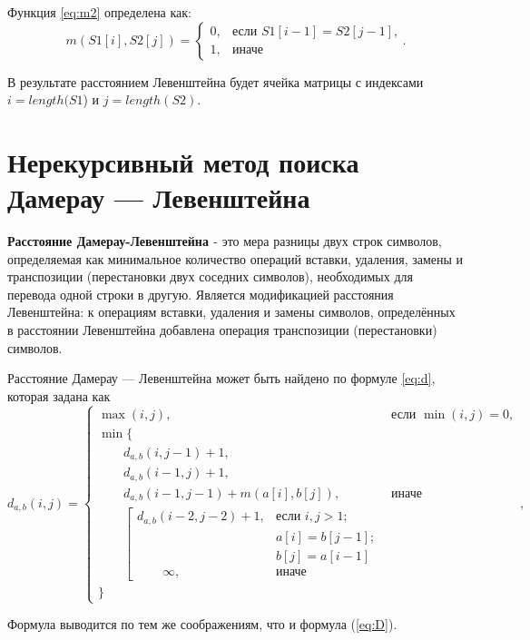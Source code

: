 Функция \ref{eq:m2} определена как:
\begin{equation}
\label{eq:m2}
m(S1[i], S2[j]) = \begin{cases}
0, &\text{если $S1[i - 1] = S2[j - 1]$,}\\
1, &\text{иначе}
\end{cases}.
\end{equation}
 
В результате расстоянием Левенштейна будет ячейка матрицы с индексами $i = length(S1$) и $j = length(S2)$.

\newpage
\section{Нерекурсивный метод поиска Дамерау — Левенштейна}

\textbf{Расстояние Дамерау-Левенштейна \cite{Dameray_Levenshtein}} - это мера разницы двух строк символов, определяемая как минимальное количество операций вставки, удаления, замены и транспозиции (перестановки двух соседних символов), необходимых для перевода одной строки в другую. Является модификацией расстояния Левенштейна: к операциям вставки, удаления и замены символов, определённых в расстоянии Левенштейна добавлена операция транспозиции (перестановки) символов.

Расстояние Дамерау — Левенштейна может быть найдено по формуле \ref{eq:d}, которая задана как
\begin{equation}
	\label{eq:d}
	d_{a,b}(i, j) = \begin{cases}
		\max(i, j), &\text{если }\min(i, j) = 0,\\
		\min \lbrace \\
			\qquad d_{a,b}(i, j-1) + 1,\\
			\qquad d_{a,b}(i-1, j) + 1,\\
			\qquad d_{a,b}(i-1, j-1) + m(a[i], b[j]), &\text{иначе}\\
			\qquad \left[ \begin{array}{cc}d_{a,b}(i-2, j-2) + 1, &\text{если }i,j > 1;\\
			\qquad &\text{}a[i] = b[j-1]; \\
			\qquad &\text{}b[j] = a[i-1]\\
			\qquad \infty, & \text{иначе}\end{array}\right.\\
		\rbrace
		\end{cases},
\end{equation}

Формула выводится по тем же соображениям, что и формула (\ref{eq:D}).

